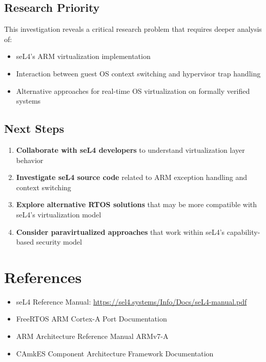 \documentclass[11pt]{article}
\begin{document}
\subsection{Research Priority}
This investigation reveals a critical research problem that requires deeper analysis of:
\begin{itemize}
    \item seL4's ARM virtualization implementation
    \item Interaction between guest OS context switching and hypervisor trap handling
    \item Alternative approaches for real-time OS virtualization on formally verified systems
\end{itemize}

\subsection{Next Steps}
\begin{enumerate}
    \item \textbf{Collaborate with seL4 developers} to understand virtualization layer behavior
    \item \textbf{Investigate seL4 source code} related to ARM exception handling and context switching
    \item \textbf{Explore alternative RTOS solutions} that may be more compatible with seL4's virtualization model
    \item \textbf{Consider paravirtualized approaches} that work within seL4's capability-based security model
\end{enumerate}

\section{References}

\begin{itemize}
    \item seL4 Reference Manual: \url{https://sel4.systems/Info/Docs/seL4-manual.pdf}
    \item FreeRTOS ARM Cortex-A Port Documentation
    \item ARM Architecture Reference Manual ARMv7-A
    \item CAmkES Component Architecture Framework Documentation
\end{itemize}
\end{document}
